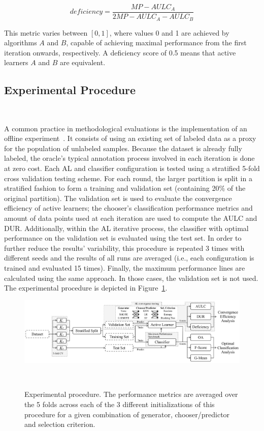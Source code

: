 \documentclass[parskip=full]{scrartcl}
\begin{document}
\begin{equation}
    deficiency = \frac{MP-AULC_A}{2MP-AULC_A-AULC_B} 
\end{equation}

This metric varies between $[0,1]$, where values 0 and 1 are achieved by
algorithms $A$ and $B$, capable of achieving maximal performance from the first
iteration onwards, respectively. A deficiency score of 0.5 means that active
learners $A$ and $B$ are equivalent.

\subsection{Experimental Procedure}~\label{sec:experimental_procedure}

A common practice in methodological evaluations is the implementation of an
offline experiment~\cite{Kagy2019}. It consists of using an existing set of
labeled data as a proxy for the population of unlabeled samples. Because the
dataset is already fully labeled, the oracle's typical annotation process
involved in each iteration is done at zero cost. Each AL and classifier
configuration is tested using a stratified 5-fold cross validation testing
scheme. For each round, the larger partition is split in a stratified fashion to
form a training and validation set (containing 20\% of the original partition).
The validation set is used to evaluate the convergence efficiency of active
learners; the chooser's classification performance metrics and amount of data
points used at each iteration are used to compute the AULC and DUR\@.
Additionally, within the AL iterative process, the classifier with optimal
performance on the validation set is evaluated using the test set. In order to
further reduce the results' variability, this procedure is repeated 3 times with
different seeds and the results of all runs are averaged (i.e., each
configuration is trained and evaluated 15 times). Finally, the maximum
performance lines are calculated using the same approach. In those cases, the
validation set is not used. The experimental procedure is depicted in
Figure~\ref{fig:experiment_pipeline}.

\begin{figure}[H]
	\centering
	\includegraphics[width=1\linewidth]{../analysis/experiment_pipeline}
	\caption{Experimental procedure. The performance metrics are averaged over
    the 5 folds across each of the 3 different initializations of this procedure
    for a given combination of generator, chooser/predictor and selection
    criterion.}~\label{fig:experiment_pipeline}
\end{figure}
\end{document}
